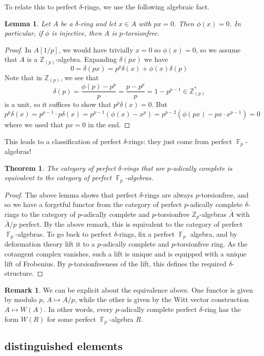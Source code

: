 \documentclass[12pt]{amsproc}
\newtheorem*{thm}{Theorem}
\newtheorem{lemma}{Lemma}
\theoremstyle{definition}
\newtheorem*{remark}{Remark}
\newcommand{\Z}{\mathbb{Z}}
\DeclareMathOperator{\F}{\mathbb{F}}
\begin{document}
To relate this to perfect $\delta$-rings, we use the following algebraic fact.

\begin{lemma} Let $A$ be a $\delta$-ring and let $x\in A$ with $px=0$. Then $\phi(x)=0$. In particular, if $\phi$ is injective, then $A$ is $p$-torsionfree. \end{lemma}
\begin{proof}
In $A[1/p]$, we would have trivially $x=0$ so $\phi(x)=0$, so we assume that $A$ is a $\Z_{(p)}$-algebra. Expanding $\delta(px)$ we have
\[	0 = \delta(px)=p^p\delta(x)+\phi(x)\delta(p)	\]
Note that in $\Z_{(p)}$, we see that
\[	\delta(p)=\frac{\phi(p)-p^p}{p}=\frac{p-p^p}{p}=1-p^{p-1}\in\Z^*_{(p)}	\]
is a unit, so it suffices to show that $p^p\delta(x)=0$. But
\[	p^p\delta(x)=p^{p-1}\cdot p\delta(x)=p^{p-1}(\phi(x)-x^p)=p^{p-2}(\phi(px)-px\cdot x^{p-1})=0	\]
where we used that $px=0$ in the end.
\end{proof}

This leads to a classification of perfect $\delta$-rings: they just come from perfect $\F_p$-algebras!

\begin{thm} The category of perfect $\delta$-rings that are $p$-adically complete is equivalent to the category of perfect $\F_p$-algebras.
\end{thm}
\begin{proof}
The above lemma shows that perfect $\delta$-rings are always $p$-torsionfree, and so we have a forgetful functor from the category of perfect $p$-adically complete $\delta$-rings to the category of $p$-adically complete and $p$-torsionfree $\Z_p$-algebras $\bar{A}$ with $\bar{A}/p$ perfect. By the above remark, this is equivalent to the category of perfect $\F_p$-algebras. To go back to perfect $\delta$-rings, fix a perfect $\F_p$ algebra, and by deformation theory lift it to a $p$-adically complete and $p$-torsionfree ring. As the cotangent complex vanishes, such a lift is unique and is equipped with a unique lift of Frobenius. By $p$-torsionfreeness of the lift, this defines the required $\delta$-structure.
\end{proof}


\begin{remark}
We can be explicit about the equivalence above. One functor is given by modulo $p$, $A\mapsto A/p$, while the other is given by the Witt vector construction $A\mapsto W(A)$. In other words, every $p$-adically complete perfect $\delta$-ring has the form $W(R)$ for some perfect $\F_p$-algebra $R$.
\end{remark}

\subsection{distinguished elements}
\end{document}

